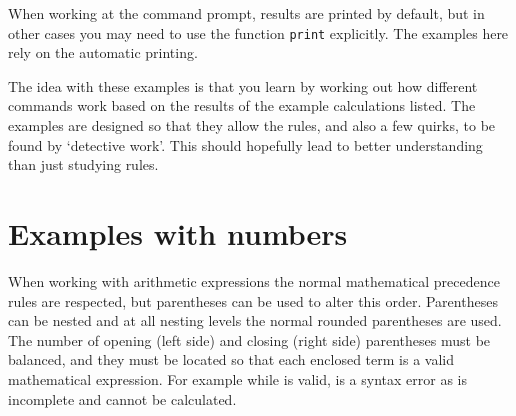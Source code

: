 \documentclass[paper=a4,10pt,div=17,headsepline,BCOR=12mm,twoside,open=right]{scrbook}\usepackage{knitr}
\begin{document}
When working at the command prompt, results are printed by default, but in other cases you may need to use the function \texttt{print} explicitly. The examples here rely on the automatic printing.

The idea with these examples is that you learn by working out how different commands work based on the results of the example calculations listed. The examples are designed so that they allow the rules, and also a few quirks, to be found by `detective work'. This should hopefully lead to better understanding than just studying rules.

\section{Examples with numbers}

When working with arithmetic expressions the normal mathematical precedence rules are respected, but parentheses can be used to alter this order. Parentheses can be nested and at all nesting levels the normal rounded parentheses are used. The number of opening (left side) and closing (right side) parentheses must be balanced, and they must be located so that each enclosed term is a valid mathematical expression. For example while  is valid,  is a syntax error as  is incomplete and cannot be calculated.  
\end{document}
